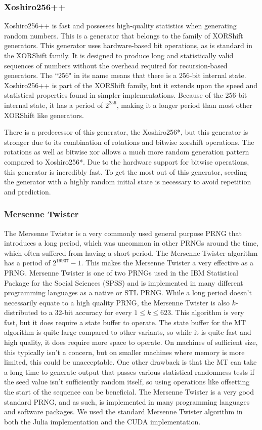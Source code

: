\documentclass{article}
\begin{document}
            \subsubsection{Xoshiro256++}
Xoshiro256++ is fast and possesses high-quality statistics when generating random numbers. This is a generator that belongs to the family of XORShift generators. This generator uses hardware-based bit operations, as is standard in the XORShift family. It is designed to produce long and statistically valid sequences of numbers without the overhead required for recursion-based generators. The ``256" in its name means that there is a 256-bit internal state. Xoshiro256++ is part of the XORShift family, but it extends upon the speed and statistical properties found in simpler implementations. Because of the 256-bit internal state, it has a period of $2^{256}$, making it a longer period than most other XORShift like generators. 

There is a predecessor of this generator, the Xoshiro256*, but this generator is stronger due to its combination of rotations and bitwise xorshift operations. The rotations as well as bitwise xor allows a much more random generation pattern compared to Xoshiro256*. Due to the hardware support for bitwise operations, this generator is incredibly fast. To get the most out of this generator, seeding the generator with a highly random initial state is necessary to avoid repetition and prediction.


            \subsubsection{Mersenne Twister} 
The Mersenne Twister is a very commonly used general purpose PRNG that introduces a long period, which was uncommon in other PRNGs around the time, which often suffered from having a short period. The Mersenne Twister algorithm has a period of $2^19937-1$. This makes the Mersenne Twister a very effective as a PRNG. Mersenne Twister is one of two PRNGs used in the IBM Statistical Package for the Social Sciences (SPSS) and is implemented in many different programming languages as a native or STL PRNG. While a long period doesn't necessarily equate to a high quality PRNG, the Mersenne Twister is also $k$-distributed to a 32-bit accuracy for every $1\leq k\leq623$. This algorithm is very fast, but it does require a state buffer to operate. The state buffer for the MT algorithm is quite large compared to other variants, so while it is quite fast and high quality, it does require more space to operate. On machines of sufficient size, this typically isn't a concern, but on smaller machines where memory is more limited, this could be unacceptable. One other drawback is that the MT can take a long time to generate output that passes various statistical randomness tests if the seed value isn't sufficiently random itself, so using operations like offsetting the start of the sequence can be beneficial. The Mersenne Twister is a very good standard PRNG, and as such, is implemented in many programming languages and software packages. We used the standard Mersenne Twister algorithm in both the Julia implementation and the CUDA implementation.
\end{document}
